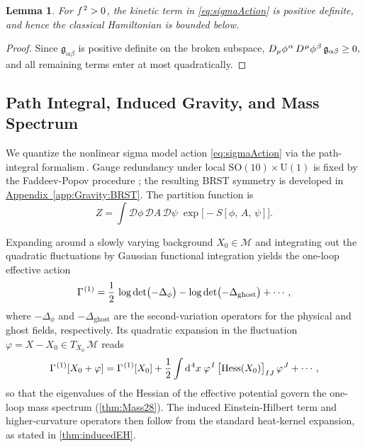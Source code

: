 \documentclass[pdflatex,sn-mathphys-num]{sn-jnl}
\theoremstyle{thmstyleone}
\newtheorem{lemma}[lemma]{Lemma}
\theoremstyle{thmstyletwo}%
\theoremstyle{thmstylethree}%
\newcommand{\SO}[1]{\mathrm{SO(#1)}}
\newcommand{\U}[1]{\mathrm{U(#1)}}
\newcommand{\SOTen}{\SO{10}}
\newcommand{\UOne}{\U{1}}
\newcommand{\SOTenXUOne}{\SOTen \times \UOne}
\newcommand{\sm}{\hspace{.065em}}
\newcommand{\appref}[1]{\hyperref[#1]{Appendix~\ref*{#1}}}
\newcommand{\smexp}[1]{^{\sm #1}}
\newcommand{\Hess}[1]{\operatorname{Hess}}
\newcommand{\dv}[1]{\mathrm{d}\smexp{#1}}
\begin{document}
\begin{lemma}\label{lem:positivity}
For $f\smexp{2}>0$, the kinetic term in \eqref{eq:sigmaAction} is positive definite, and hence the classical Hamiltonian is bounded below.
\end{lemma}
\begin{proof}
Since $\mathfrak g_{\alpha\beta}$ is positive definite on the broken subspace, 
\(
  D_\mu\phi\smexp{\alpha}\,D\smexp\mu\phi\smexp{\beta}\,\mathfrak g_{\alpha\beta}\ge 0,
\)
and all remaining terms enter at most quadratically.  
\end{proof}

\subsection{Path Integral, Induced Gravity, and Mass Spectrum}
\label{subsec:quantization}

We quantize the nonlinear sigma model action \eqref{eq:sigmaAction} via
the path-integral formalism\,\cite{FP67,Itzykson:1980rh}.  Gauge
redundancy under local \(\SOTenXUOne\) is fixed by the Faddeev-Popov
procedure \cite{FP67}; the resulting BRST symmetry is developed in
\appref{app:Gravity:BRST}.  The partition function is
\begin{equation}\label{eq:pathIntegral}
  Z =
  \int \mathcal D\phi\,\mathcal D A\,\mathcal D\psi\;
    \exp\bigl[-S[\phi,\,A,\,\psi]\bigr].
\end{equation}

Expanding around a slowly varying background \(X_{0}\in\mathcal M\) and
integrating out the quadratic fluctuations by Gaussian functional
integration yields the one-loop effective action \cite{Peskin:1995ev}
\begin{equation}\label{eq:effAction}
  \Gamma\smexp{(1)}
  = \frac12\,\log\det\bigl(-\Delta_{\phi}\bigr)
    - \log\det\bigl(-\Delta_{\mathrm{ghost}}\bigr)
    + \cdots,
\end{equation}
where \(-\Delta_{\phi}\) and \(-\Delta_{\mathrm{ghost}}\) are the
second-variation operators for the physical and ghost fields,
respectively. Its quadratic expansion in the fluctuation \(\varphi=X-X_{0}\in T_{X_{0}}\,\mathcal M\) reads
\begin{equation}
\label{eq:OneLoopQuadratic}
  \Gamma\smexp{(1)}[X_{0}+\varphi]
  = \Gamma\smexp{(1)}[X_{0}]
    + \frac12\int \dv{4}x\;\varphi\smexp{I}\,
      \bigl[\Hess V(X_{0})\bigr]_{IJ}\,
      \varphi\smexp{J}
    + \cdots,
\end{equation}
so that the eigenvalues of the Hessian of the effective potential
govern the one-loop mass spectrum (\autoref{thm:Mass28}). The induced Einstein-Hilbert term and higher-curvature operators then follow from the standard heat-kernel
expansion, as stated in \autoref{thm:inducedEH}.
\end{document}
